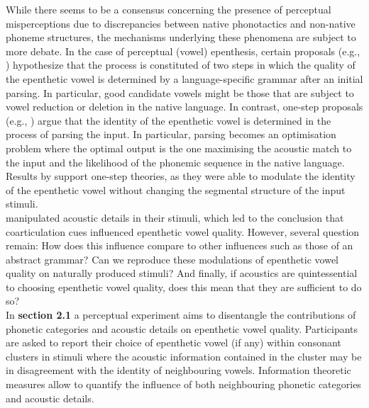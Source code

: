 


{\color{blue}
While there seems to be a consensus concerning the presence of perceptual misperceptions due to discrepancies between native phonotactics and non-native phoneme structures, the mechanisms underlying these phenomena are subject to more debate. In the case of perceptual (vowel) epenthesis, certain proposals (e.g., \cite{berent2007, monahan2009}) hypothesize that the process is constituted of two steps in which the quality of the epenthetic vowel is determined by a language-specific grammar after an initial parsing. In particular, good candidate vowels might be those that are subject to vowel reduction or deletion in the native language.  
In contrast, one-step proposals (e.g., \cite{dupoux2011}) argue that the identity of the epenthetic vowel is determined in the process of parsing the input. In particular, parsing becomes an optimisation problem where the optimal output is the one maximising the acoustic match to the input and the likelihood of the phonemic sequence in the native language. Results by \cite{dupoux2011} support one-step theories, as they were able to modulate the identity of the epenthetic vowel without changing the segmental structure of the input stimuli. \\

\cite{dupoux2011} manipulated acoustic details in their stimuli, which led to the conclusion that coarticulation cues influenced epenthetic vowel quality. However, several question remain: How does this influence compare to other influences such as those of an abstract grammar? Can we reproduce these modulations of epenthetic vowel quality on naturally produced stimuli? And finally, if acoustics are quintessential to choosing epenthetic vowel quality, does this mean that they are sufficient to do so? \\

In \textbf{section 2.1} a perceptual experiment aims to disentangle the contributions of phonetic categories and acoustic details on epenthetic vowel quality. Participants are asked to report their choice of epenthetic vowel (if any) within consonant clusters in stimuli where the acoustic information contained in the cluster may be in disagreement with the identity of neighbouring vowels. Information theoretic measures allow to quantify the influence of both neighbouring phonetic categories and acoustic details.  \\


}
